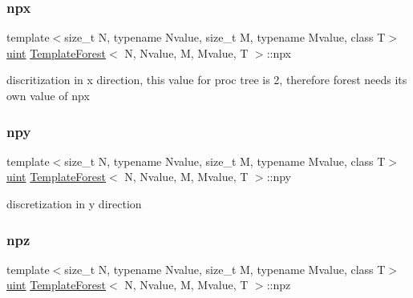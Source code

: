 \mbox{\label{classTemplateForest_ac16738374c9880720dbb28de832a15f2}} 
\subsubsection{\texorpdfstring{npx}{npx}}
{\footnotesize\ttfamily template$<$size\+\_\+t N, typename Nvalue, size\+\_\+t M, typename Mvalue, class T$>$ \\
\mbox{\hyperlink{definitions_8h_a69aa29b598b851b0640aa225a9e5d61d}{uint}} \mbox{\hyperlink{classTemplateForest}{Template\+Forest}}$<$ N, Nvalue, M, Mvalue, T $>$\+::npx\hspace{0.3cm}{\ttfamily [protected]}}

discritization in x direction, this value for proc tree is 2, therefore forest needs its own value of npx \mbox{\label{classTemplateForest_afe37cbd294cd78c9f19cda314b21809e}} 
\subsubsection{\texorpdfstring{npy}{npy}}
{\footnotesize\ttfamily template$<$size\+\_\+t N, typename Nvalue, size\+\_\+t M, typename Mvalue, class T$>$ \\
\mbox{\hyperlink{definitions_8h_a69aa29b598b851b0640aa225a9e5d61d}{uint}} \mbox{\hyperlink{classTemplateForest}{Template\+Forest}}$<$ N, Nvalue, M, Mvalue, T $>$\+::npy\hspace{0.3cm}{\ttfamily [protected]}}

discretization in y direction \mbox{\label{classTemplateForest_a8854c681d680f83d4a16a89f72b60b43}} 
\subsubsection{\texorpdfstring{npz}{npz}}
{\footnotesize\ttfamily template$<$size\+\_\+t N, typename Nvalue, size\+\_\+t M, typename Mvalue, class T$>$ \\
\mbox{\hyperlink{definitions_8h_a69aa29b598b851b0640aa225a9e5d61d}{uint}} \mbox{\hyperlink{classTemplateForest}{Template\+Forest}}$<$ N, Nvalue, M, Mvalue, T $>$\+::npz\hspace{0.3cm}{\ttfamily [protected]}}

